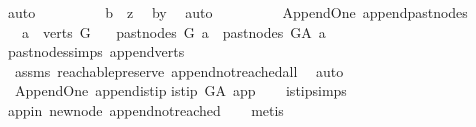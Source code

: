 \begin{isabellebody}
\ auto\isanewline
\ \ \ \ \ \ \isamarkupfalse%
\ \isamarkupfalse%
\ {\isachardoublequoteopen}b\ {\isasymrightarrow}\isactrlsup {\isacharplus}{\kern0pt}\ z{\isachardoublequoteclose}\ \isamarkupfalse%
\ b{\isacharunderscore}{\kern0pt}y\ \isamarkupfalse%
\ auto\isanewline
\ \ \ \ \isamarkupfalse%
\isanewline
\ \ \isamarkupfalse%
%
\endisatagproof
{\isafoldproof}%
%
\isadelimproof
\isanewline
%
\endisadelimproof
\isanewline
{}\isamarkupfalse%
\ {\isacharparenleft}{\kern0pt}\ Append{\isacharunderscore}{\kern0pt}One{\isacharparenright}{\kern0pt}\ append{\isacharunderscore}{\kern0pt}past{\isacharunderscore}{\kern0pt}nodes{\isacharcolon}{\kern0pt}\isanewline
\ \ \ {\isachardoublequoteopen}a\ {\isasymin}\ verts\ G{\isachardoublequoteclose}\isanewline
\ \ \ {\isachardoublequoteopen}past{\isacharunderscore}{\kern0pt}nodes\ G\ a\ {\isacharequal}{\kern0pt}\ past{\isacharunderscore}{\kern0pt}nodes\ G{\isacharunderscore}{\kern0pt}A\ a{\isachardoublequoteclose}\isanewline
%
\isadelimproof
\ \ %
\endisadelimproof
%
\isatagproof
{}\isamarkupfalse%
\ past{\isacharunderscore}{\kern0pt}nodes{\isachardot}{\kern0pt}simps\ append{\isacharunderscore}{\kern0pt}verts\ \isamarkupfalse%
\ \isanewline
\ \ assms\ reachable{}{\isacharunderscore}{\kern0pt}preserve\ append{\isacharunderscore}{\kern0pt}not{\isacharunderscore}{\kern0pt}reached{\isacharunderscore}{\kern0pt}all\ \isamarkupfalse%
\ auto%
\endisatagproof
{\isafoldproof}%
%
\isadelimproof
\isanewline
%
\endisadelimproof
\isanewline
{}\isamarkupfalse%
\ {\isacharparenleft}{\kern0pt}\ Append{\isacharunderscore}{\kern0pt}One{\isacharparenright}{\kern0pt}\ append{\isacharunderscore}{\kern0pt}is{\isacharunderscore}{\kern0pt}tip{\isacharcolon}{\kern0pt}\isanewline
{\isachardoublequoteopen}is{\isacharunderscore}{\kern0pt}tip\ G{\isacharunderscore}{\kern0pt}A\ app{\isachardoublequoteclose}\isanewline
%
\isadelimproof
\ \ %
\endisadelimproof
%
\isatagproof
{}\isamarkupfalse%
\ is{\isacharunderscore}{\kern0pt}tip{\isachardot}{\kern0pt}simps\ \isanewline
\ \ \isamarkupfalse%
\ app{\isacharunderscore}{\kern0pt}in\ new{\isacharunderscore}{\kern0pt}node\ append{\isacharunderscore}{\kern0pt}not{\isacharunderscore}{\kern0pt}reached\isanewline
\ \ \isamarkupfalse%
\ metis%
\endisatagproof
{\isafoldproof}%
%
\isadelimproof
\isanewline

\end{isabellebody}
